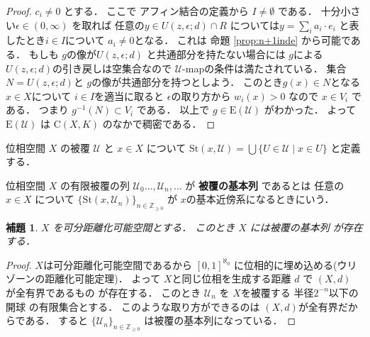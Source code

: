 \documentclass[leqno, a4paper, 12pt]{jsarticle}
\newtheorem{lem}[thm]{補題}
\newcommand{\zz}{\mathbb{Z}}
\newcommand{\yoemph}[1]{\textbf{#1}}
\newcommand{\yocovf}[1]{\mathcal{#1}}
\newcommand{\yostset}[1]{\mathrm{St}(#1)}
\newcommand{\yofuncsp}[2]{\mathrm{C}(#1, #2)}
\newcommand{\yofsusm}[1]{\mathrm{E}(#1)}
\numberwithin{equation}{section}
\begin{document}
\begin{proof}
$c_{i}\neq 0$
とする．
ここで
アフィン結合の定義から
$I\neq \emptyset$
である．
十分小さい$\epsilon\in (0, \infty)$
を取れば
任意の$y\in U(z, \epsilon; d)\cap R$
については$y=\sum_{i}a_{i}\cdot e_{i}$
と表したとき$i\in I$について
$a_{i}\neq 0$となる．
これは
命題
\ref{prop:n+1inde}
から可能である．
もしも
$g$の像が$U(z, \epsilon; d)$
と共通部分を持たない場合には
$g$による$U(z, \epsilon; d)$の引き戻しは空集合なので
$\yocovf{U}$-mapの条件は満たされている．
集合$N=U(z, \epsilon; d)$と
$g$の像が共通部分を持つとしよう．
このとき$g(x)\in N$となる
$x\in X$について
$i\in I$を適当に取ると
$\epsilon$の取り方から
$w_{i}(x)>0$
なので
$x\in V_{i}$
である．
つまり
$g^{-1}(N)\subset V_{i}$
である．
以上で
$g\in \yofsusm{\yocovf{U}}$
がわかった．
よって
$\yofsusm{\yocovf{U}}$
は
$\yofuncsp{X}{K}$
のなかで稠密である．
\end{proof}


位相空間
$X$
の被覆
$\yocovf{U}$
と
$x\in X$
について
$\yostset{x, \yocovf{U}}=\bigcup\{U\in \yocovf{U}\mid x\in U\}$
と定義する．

位相空間
$X$
の有限被覆の列
$\yocovf{U}_{0}\dots, \yocovf{U}_{n}, \dots$
が
\yoemph{被覆の基本列}
であるとは
任意の$x\in X$
について
$\{\yostset{x, \yocovf{U}_{n}}\}_{n\in \zz_{\ge 0}}$
が
$x$の基本近傍系になるときにいう．

\begin{lem}\label{lem:kihonretu}
$X$
を可分距離化可能空間とする．
このとき
$X$
には被覆の基本列
が存在する．
\end{lem}
\begin{proof}
$X$は可分距離化可能空間であるから
$[0, 1]^{\aleph_{0}}$
に位相的に埋め込める(ウリゾーンの距離化可能定理)．
よって
$X$と同じ位相を生成する距離
$d$
で
$(X, d)$
が全有界であるもの
が存在する．
このとき
$\yocovf{U}_{n}$
を
$X$を被覆する
半径$2^{-n}$以下の開球
の有限集合とする．
このような取り方ができるのは
$(X, d)$が全有界だからである．
すると
$\{\yocovf{U}_{n}\}_{n\in \zz_{\ge0}}$
は被覆の基本列になっている．
\end{proof}
\end{document}
